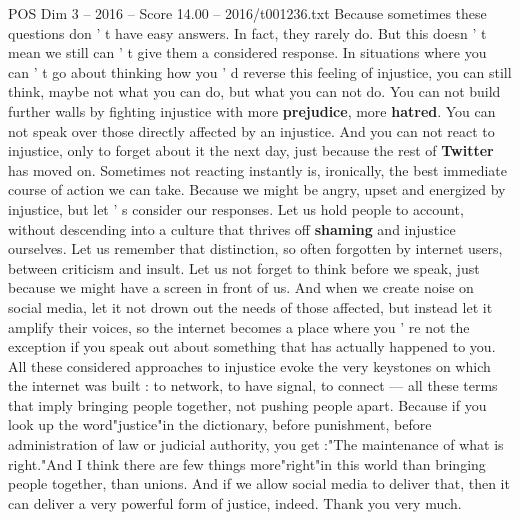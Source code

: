 \begin{textsample}{POS Dim 3 – 2016 – Score 14.00 – 2016/t001236.txt}
Because sometimes these questions don ' t have easy answers.
In fact, they rarely do.
But this doesn ' t mean we still can ' t give them a considered response.
In situations where you can ' t go about thinking how you ' d reverse this feeling of injustice, you can still think, maybe not what you can do, but what you can not do.
You can not build further walls by fighting injustice with more \textbf{prejudice}, more \textbf{hatred}.
You can not speak over those directly affected by an injustice.
And you can not react to injustice, only to forget about it the next day, just because the rest of \textbf{Twitter} has moved on.
Sometimes not reacting instantly is, ironically, the best immediate course of action we can take.
Because we might be angry, upset and energized by injustice, but let ' s consider our responses.
Let us hold people to account, without descending into a culture that thrives off \textbf{shaming} and injustice ourselves.
Let us remember that distinction, so often forgotten by internet users, between criticism and insult.
Let us not forget to think before we speak, just because we might have a screen in front of us.
And when we create noise on social media, let it not drown out the needs of those affected, but instead let it amplify their voices, so the internet becomes a place where you ' re not the exception if you speak out about something that has actually happened to you.
All these considered approaches to injustice evoke the very keystones on which the internet was built : to network, to have signal, to connect — all these terms that imply bringing people together, not pushing people apart.
Because if you look up the word"justice"in the dictionary, before punishment, before administration of law or judicial authority, you get :"The maintenance of what is right."And I think there are few things more"right"in this world than bringing people together, than unions.
And if we allow social media to deliver that, then it can deliver a very powerful form of justice, indeed.
Thank you very much.

\end{textsample}

